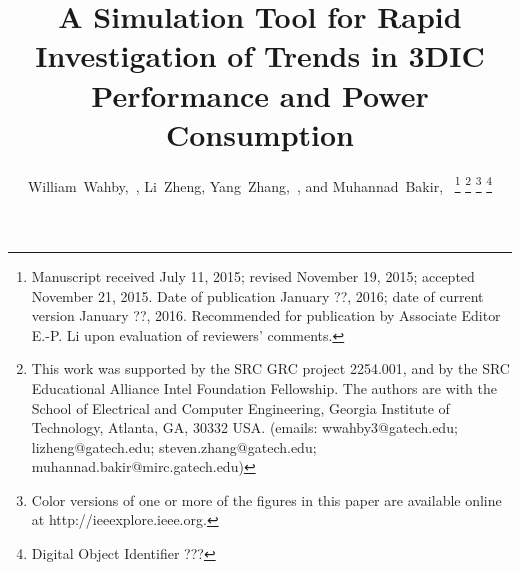 \documentclass[journal,twoside]{IEEEtran}
\newcommand{\changed}[1]{\textcolor{red}{#1}}
\newcommand{\rerechanged}[1]{\textcolor{red}{#1}}
\renewcommand{\changed}[1]{#1} %
\renewcommand{\rerechanged}[1]{#1} %
\begin{document}

\title{\changed{A Simulation Tool for Rapid Investigation of Trends in 3DIC Performance and Power Consumption}}
\author{William~Wahby,~, Li~Zheng, Yang~Zhang,~, and Muhannad~Bakir,~%
	\thanks{\rerechanged{Manuscript received July 11, 2015; \changed{revised November 19, 2015; accepted November 21, 2015. Date of publication January ??, 2016; date of current version January ??, 2016. Recommended for publication by Associate Editor E.-P. Li upon evaluation of reviewers' comments.}}}%
	\thanks{This work was supported by the SRC GRC project 2254.001, and by the SRC Educational Alliance Intel Foundation Fellowship. The authors are with the School of Electrical and Computer Engineering, Georgia Institute of Technology, Atlanta, GA, 30332 USA. (emails: wwahby3@gatech.edu; lizheng@gatech.edu; steven.zhang@gatech.edu; muhannad.bakir@mirc.gatech.edu)}%
	\thanks{\rerechanged{Color versions of one or more of the figures in this paper are available online at http://ieeexplore.ieee.org.}}%
	\thanks{\rerechanged{Digital Object Identifier ???}} }%



\maketitle

\end{document}
